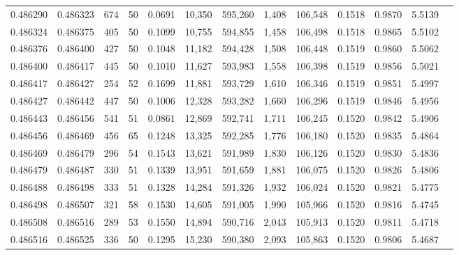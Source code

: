 \begin{tabular}{rrrrrrrrrrrrr}
0.486290 & 0.486323 & 674 &  50 &                                     0.0691 &  10,350 & 595,260 &   1,408 & 106,548 & 0.1518 & 0.9870 & 5.5139 \\
0.486324 & 0.486375 & 405 &  50 &                                     0.1099 &  10,755 & 594,855 &   1,458 & 106,498 & 0.1518 & 0.9865 & 5.5102 \\
0.486376 & 0.486400 & 427 &  50 &                                     0.1048 &  11,182 & 594,428 &   1,508 & 106,448 & 0.1519 & 0.9860 & 5.5062 \\
0.486400 & 0.486417 & 445 &  50 &                                     0.1010 &  11,627 & 593,983 &   1,558 & 106,398 & 0.1519 & 0.9856 & 5.5021 \\
0.486417 & 0.486427 & 254 &  52 &                                     0.1699 &  11,881 & 593,729 &   1,610 & 106,346 & 0.1519 & 0.9851 & 5.4997 \\
0.486427 & 0.486442 & 447 &  50 &                                     0.1006 &  12,328 & 593,282 &   1,660 & 106,296 & 0.1519 & 0.9846 & 5.4956 \\
0.486443 & 0.486456 & 541 &  51 &                                     0.0861 &  12,869 & 592,741 &   1,711 & 106,245 & 0.1520 & 0.9842 & 5.4906 \\
0.486456 & 0.486469 & 456 &  65 &                                     0.1248 &  13,325 & 592,285 &   1,776 & 106,180 & 0.1520 & 0.9835 & 5.4864 \\
0.486469 & 0.486479 & 296 &  54 &                                     0.1543 &  13,621 & 591,989 &   1,830 & 106,126 & 0.1520 & 0.9830 & 5.4836 \\
0.486479 & 0.486487 & 330 &  51 &                                     0.1339 &  13,951 & 591,659 &   1,881 & 106,075 & 0.1520 & 0.9826 & 5.4806 \\
0.486488 & 0.486498 & 333 &  51 &                                     0.1328 &  14,284 & 591,326 &   1,932 & 106,024 & 0.1520 & 0.9821 & 5.4775 \\
0.486498 & 0.486507 & 321 &  58 &                                     0.1530 &  14,605 & 591,005 &   1,990 & 105,966 & 0.1520 & 0.9816 & 5.4745 \\
0.486508 & 0.486516 & 289 &  53 &                                     0.1550 &  14,894 & 590,716 &   2,043 & 105,913 & 0.1520 & 0.9811 & 5.4718 \\
0.486516 & 0.486525 & 336 &  50 &                                     0.1295 &  15,230 & 590,380 &   2,093 & 105,863 & 0.1520 & 0.9806 & 5.4687 \\

\end{tabular}
